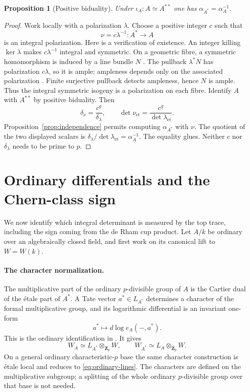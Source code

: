 \documentclass[11pt]{article}
\newtheorem{proposition}[theorem]{Proposition}
\theoremstyle{definition}\newtheorem{definition}[theorem]{Definition}
\theoremstyle{remark}\newtheorem{remark}[theorem]{Remark}
\newcommand{\ZZ}{\mathbf Z}
\newcommand{\et}{\mathrm{et}}
\begin{document}
\begin{proposition}[Positive biduality]\label{prop:bidual}
Under $\iota_A:A\simeq A^{**}$ one has $\alpha_{A^*}=\alpha_A^{-1}$.
\end{proposition}
\begin{proof}
Work locally with a polarization $\lambda$. Choose a positive integer $c$ such that
\[
 \nu=c\lambda^{-1}:A^*\longrightarrow A
\]
is an integral polarization. Here is a verification of existence. An integer killing $\ker\lambda$ makes $c\lambda^{-1}$ integral and symmetric. On a geometric fibre, a symmetric homomorphism is induced by a line bundle $N$ \citep[Proposition~11.2 and Corollary~11.3, pp.~159--160]{EGM}. The pullback $\lambda^*N$ has polarization $c\lambda$, so it is ample; ampleness depends only on the associated polarization \citep[Proposition~11.4, p.~160]{EGM}. Finite surjective pullback detects ampleness, hence $N$ is ample. Thus the integral symmetric isogeny is a polarization on each fibre. Identify $A$ with $A^{**}$ by positive biduality. Then
\[
 \delta_\nu=\frac{c^g}{\delta_\lambda},\qquad
 \det\nu_{\et}=\frac{c^g}{\det\lambda_{\et}}.
\]
Proposition~\ref{prop:independence} permits computing $\alpha_{A^*}$ with $\nu$. The quotient of the two displayed scalars is $\delta_\lambda/\det\lambda_{\et}=\alpha_A^{-1}$. The equality glues. Neither $c$ nor $\delta_\lambda$ needs to be prime to $p$.
\end{proof}

\section{Ordinary differentials and the Chern-class sign}\label{sec:dlog}

We now identify which integral determinant is measured by the top trace, including the sign coming from the de Rham cup product. Let $A/k$ be ordinary over an algebraically closed field, and first work on its canonical lift to $W=W(k)$.

\paragraph{The character normalization.}
The multiplicative part of the ordinary $p$-divisible group of $A$ is the Cartier dual of the \'etale part of $A^*$. A Tate vector $a^*\in L_{A^*}$ determines a character of the formal multiplicative group, and its logarithmic differential is an invariant one-form
\[
 a^*\longmapsto d\log e_A(-,a^*).
\]
This is the ordinary identification in \citet[\S3.3, pp.~161--162]{Katz}. It gives
\begin{equation}\label{eq:dlog}
 W_A\simeq L_{A^*}\otimes_{\ZZ_p}W,
 \qquad W_{A^*}\simeq L_A\otimes_{\ZZ_p}W.
\end{equation}
On a general ordinary characteristic-$p$ base the same character construction is \'etale local and reduces to \eqref{eq:ordinary-lines}. The characters are defined on the multiplicative subgroup; a splitting of the whole ordinary $p$-divisible group over that base is not needed.
\end{document}
